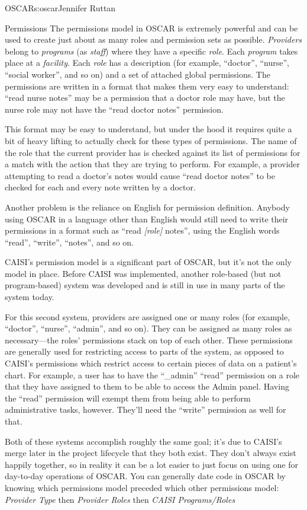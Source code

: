 \begin{aosachapter}{OSCAR}{s:oscar}{Jennifer Ruttan}
\begin{aosasect1}{Permissions}
The permissions model in OSCAR is extremely powerful
and can be used to create just about as many roles and permission sets
as possible.  
\emph{Providers} belong to \emph{programs} (as \emph{staff}) where
they have a specific \emph{role}. Each \emph{program} takes place at
a \emph{facility}. Each \emph{role} has a description (for example,
``doctor'', ``nurse'', ``social worker'', and so on) and a set of
attached global permissions. The permissions are written in a format
that makes them very easy to understand: ``read nurse notes'' may be a
permission that a doctor role may have, but the nurse role may not
have the ``read doctor notes'' permission.

This format may be easy to understand, but under the hood it requires
quite a bit of heavy lifting to actually check for these types of
permissions. The name of the role that the current provider has is
checked against its list of permissions for a match with the action
that they are trying to perform. For example, a provider attempting to 
read a doctor's notes
would cause ``read doctor notes'' to be checked for each and every note
written by a doctor.

Another problem is the reliance on English for permission definition. 
Anybody using OSCAR in a
language other than English would still need to write their
permissions in a format such as ``read \emph{[role]} notes'', using
the English words ``read'', ``write'', ``notes'', and so on.

CAISI's permission model is a significant part of OSCAR, but it's not
the only model in place. Before CAISI was implemented, another
role-based (but not program-based) system was developed and is still
in use in many parts of the system today.

For this second system, providers are assigned one or many roles (for
example, ``doctor'', ``nurse'', ``admin'', and so on). They can be
assigned as many roles as necessary---the roles' permissions stack on
top of each other. These permissions are generally used for
restricting access to parts of the system, as opposed to CAISI's
permissions which restrict access to certain pieces of data
on a patient's chart. For example, a user has to have the ``\_admin''
``read'' permission on a role that they have assigned to them to be
able to access the Admin panel. Having the ``read'' permission will
exempt them from being able to perform administrative tasks,
however. They'll need the ``write'' permission as well for that.

Both of these systems accomplish roughly the same goal; it's due to
CAISI's merge later in the project lifecycle that they both
exist. They don't always exist happily together, so in reality it can
be a lot easier to just focus on using one for day-to-day operations
of OSCAR. You can generally date code in OSCAR by knowing which
permissions model preceded which other permissions model:
\emph{Provider Type} then \emph{Provider Roles} then \emph{CAISI Programs/Roles}


\end{aosasect1}
\end{aosachapter}
